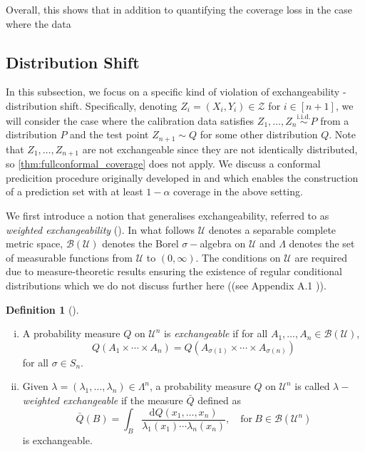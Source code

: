 \documentclass[11pt, titlepage]{article} %
\newcommand{\R}{\mathrm}
\numberwithin{equation}{section}
\theoremstyle{definition}
\newtheorem{definition}{Definition}
\numberwithin{theorem}{section}
\numberwithin{lemma}{section}
\numberwithin{corollary}{section}
\numberwithin{proposition}{section}
\numberwithin{definition}{section}
\numberwithin{remark}{section}
\begin{document}
\noindent
Overall, this shows that in addition to quantifying the coverage loss in the case where the data 

\subsection{Distribution Shift}
\label{subsec:dist_shift}

In this subsection, we focus on a specific kind of violation of exchangeability - distribution shift. Specifically, denoting \(Z_i = (X_i, Y_i) \in \mathcal{Z}\) for \(i \in [n+1]\), we will consider the case where the calibration data satisfies \(Z_1, \ldots, Z_n \overset{\R{i.i.d.}}{\sim} P\) from a distribution \(P\) and the test point \(Z_{n+1} \sim Q\) for some other distribution \(Q\). Note that \(Z_1, \ldots, Z_{n+1}\) are not exchangeable since they are not identically distributed, so \cref{thm:fullconformal_coverage} does not apply. We discuss a conformal predicition procedure originally developed in \cite{tibshirani2019covariateshift} and \cite{ramdas2021labelshift} which enables the construction of a prediction set with at least \(1-\alpha\) coverage in the above setting. \vskip5pt

\noindent
We first introduce a notion that generalises exchangeability, referred to as \textit{weighted exchangeability} (\cite{tibshirani2019covariateshift,barber2024finetti,tang2023finiteweighted}). In what follows \(\mathcal{U}\) denotes a separable complete metric space, \(\mathcal{B}(\mathcal{U})\) denotes the Borel \(\sigma-\)algebra on \(\mathcal{U}\) and \(\Lambda\) denotes the set of measurable functions from \(\mathcal{U}\) to \((0, \infty)\).  The conditions on \(\mathcal{U}\) are required due to measure-theoretic results ensuring the existence of regular conditional distributions which we do not discuss further here ((see Appendix A.1 \cite{barber2024finetti})). 

\begin{definition}[\cite{barber2024finetti,tang2023finiteweighted}]
    \begin{enumerate}[(i)] \itemsep0em
        \item A probability measure \(Q\) on \(\mathcal{U}^n\) is \textit{exchangeable} if for all \(A_1, \ldots, A_n \in \mathcal{B}(\mathcal{U})\), \[Q(A_1 \times \cdots \times A_n) = Q(A_{\sigma(1)} \times \cdots \times A_{\sigma(n)})\] for all \(\sigma \in S_n.\) 
        \item Given \(\lambda = (\lambda_1, \ldots, \lambda_n) \in \Lambda^n\), a probability measure \(Q\) on \(\mathcal{U}^n\) is called \(\lambda-\)\textit{weighted exchangeable} if the measure \(\bar{Q}\) defined as \[\bar{Q}(B) = \int_{B} \frac{\R{d}Q(x_1, \ldots, x_n)}{\lambda_1(x_1) \cdots \lambda_n(x_n)}, \quad \mathrm{for} \ B \in \mathcal{B}(\mathcal{U}^n) \] is exchangeable.
    \end{enumerate}
\label{defn:weighted_exch}
\end{definition}
\end{document}
